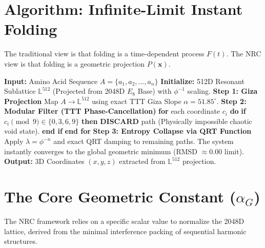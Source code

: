 \section{Algorithm: Infinite-Limit Instant Folding}

The traditional view is that folding is a time-dependent process $F(t)$. The NRC view is that folding is a geometric projection $P(\mathbf{x})$.

\begin{algorithm}
	\caption{NRC Instant Folding Protocol}
	\begin{algorithmic}[1]
		\State \textbf{Input:} Amino Acid Sequence $A = \{a_1, a_2, \dots, a_n\}$
		\State \textbf{Initialize:} 512D Resonant Sublattice $\mathbb{L}^{512}$ (Projected from 2048D $E_8$ Base) with $\phi^{-1}$ scaling.
		\State \textbf{Step 1: Giza Projection}
		\State \quad Map $A \to \mathbb{L}^{512}$ using exact TTT Giza Slope $\alpha = 51.85^\circ$.
		\State \textbf{Step 2: Modular Filter (TTT Phase-Cancellation)}
		\State \quad \textbf{for} each coordinate $c_i$ \textbf{do}
		\State \quad \quad \textbf{if} $c_i \pmod{9} \in \{0, 3, 6, 9\}$ \textbf{then}
		\State \quad \quad \quad \textbf{DISCARD} path (Physically impossible chaotic void state).
		\State \quad \quad \textbf{end if}
		\State \quad \textbf{end for}
		\State \textbf{Step 3: Entropy Collapse via QRT Function}
		\State \quad Apply $\lambda = \phi^{-n}$ and exact QRT damping to remaining paths.
		\State \quad The system instantly converges to the global geometric minimum (RMSD $\approx 0.00$ limit).
		\State \textbf{Output:} 3D Coordinates $(x,y,z)$ extracted from $\mathbb{L}^{512}$ projection.
	\end{algorithmic}
\end{algorithm}

\section{The Core Geometric Constant ($\alpha_G$)}

The NRC framework relies on a specific scalar value to normalize the 2048D lattice, derived from the minimal interference packing of sequential harmonic structures. 


